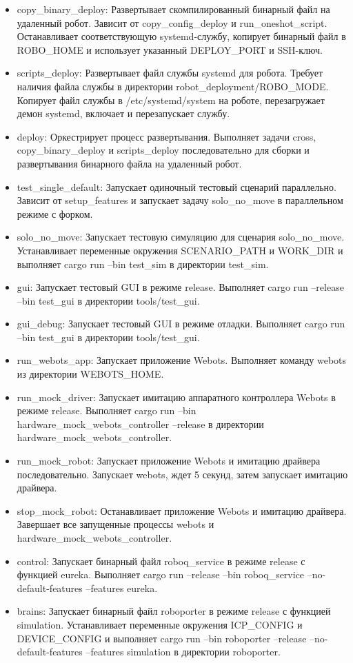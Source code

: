 \begin{itemize}
    \item {copy\_binary\_deploy}: Развертывает скомпилированный бинарный файл на удаленный робот. Зависит от copy\_config\_deploy и run\_oneshot\_script. Останавливает соответствующую systemd-службу, копирует бинарный файл в ROBO\_HOME и использует указанный DEPLOY\_PORT и SSH-ключ.
    \item {scripts\_deploy}: Развертывает файл службы systemd для робота. Требует наличия файла службы в директории robot\_deployment/ROBO\_MODE. Копирует файл службы в /etc/systemd/system на роботе, перезагружает демон systemd, включает и перезапускает службу.
    \item {deploy}: Оркестрирует процесс развертывания. Выполняет задачи cross, copy\_binary\_deploy и scripts\_deploy последовательно для сборки и развертывания бинарного файла на удаленный робот.
    \item {test\_single\_default}: Запускает одиночный тестовый сценарий параллельно. Зависит от setup\_features и запускает задачу solo\_no\_move в параллельном режиме с форком.
    \item {solo\_no\_move}: Запускает тестовую симуляцию для сценария solo\_no\_move. Устанавливает переменные окружения SCENARIO\_PATH и WORK\_DIR и выполняет cargo run --bin test\_sim в директории test\_sim.
    \item {gui}: Запускает тестовый GUI в режиме release. Выполняет cargo run --release --bin test\_gui в директории tools/test\_gui.
    \item {gui\_debug}: Запускает тестовый GUI в режиме отладки. Выполняет cargo run --bin test\_gui в директории tools/test\_gui.
    \item {run\_webots\_app}: Запускает приложение Webots. Выполняет команду webots из директории WEBOTS\_HOME.
    \item {run\_mock\_driver}: Запускает имитацию аппаратного контроллера Webots в режиме release. Выполняет cargo run --bin hardware\_mock\_webots\_controller --release в директории hardware\_mock\_webots\_controller.
    \item {run\_mock\_robot}: Запускает приложение Webots и имитацию драйвера последовательно. Запускает webots, ждет 5 секунд, затем запускает имитацию драйвера.
    \item {stop\_mock\_robot}: Останавливает приложение Webots и имитацию драйвера. Завершает все запущенные процессы webots и hardware\_mock\_webots\_controller.
    \item {control}: Запускает бинарный файл roboq\_service в режиме release с функцией eureka. Выполняет cargo run --release --bin roboq\_service --no-default-features --features eureka.
    \item {brains}: Запускает бинарный файл roboporter в режиме release с функцией simulation. Устанавливает переменные окружения ICP\_CONFIG и DEVICE\_CONFIG и выполняет cargo run --bin roboporter --release --no-default-features --features simulation в директории roboporter.
\end{itemize}
